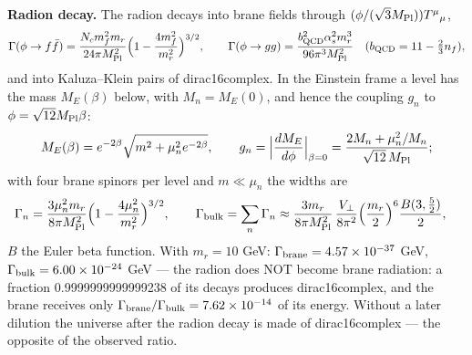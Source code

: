 \documentclass[10pt,a4paper]{article}
\begin{document}
\textbf{Radion decay.} The radion decays into brane fields through $(\phi/(\sqrt3M_{\rm Pl}))T^\mu{}_\mu$,
\begin{equation*}
\Gamma(\phi\to f\bar f)=\frac{N_cm_f^2m_r}{24\pi M_{\rm Pl}^2}\Big(1-\frac{4m_f^2}{m_r^2}\Big)^{3/2},\qquad \Gamma(\phi\to gg)=\frac{b_{\rm QCD}^2\alpha_s^2m_r^3}{96\pi^3M_{\rm Pl}^2}\quad(b_{\rm QCD}=11-\tfrac23n_f),
\end{equation*}
and into Kaluza–Klein pairs of dirac16complex. In the Einstein frame a level has the mass $M_E(\beta)$ below, with $M_n=M_E(0)$, and hence the coupling $g_n$ to $\phi=\sqrt{12}M_{\rm Pl}\beta$:
\begin{equation*}
M_E(\beta)=e^{-2\beta}\sqrt{m^2+\mu_n^2e^{-2\beta}},\qquad g_n=\Big|\frac{dM_E}{d\phi}\Big|_{\beta=0}=\frac{2M_n+\mu_n^2/M_n}{\sqrt{12}\,M_{\rm Pl}};
\end{equation*}
with four brane spinors per level and $m\ll\mu_n$ the widths are
\begin{align*}
\Gamma_n&=\frac{3\mu_n^2m_r}{8\pi M_{\rm Pl}^2}\Big(1-\frac{4\mu_n^2}{m_r^2}\Big)^{3/2},\qquad \Gamma_{\rm bulk}=\sum_n\Gamma_n\approx\frac{3m_r}{8\pi M_{\rm Pl}^2}\,\frac{V_\perp}{8\pi^2}\Big(\frac{m_r}2\Big)^6\frac{B(3,\frac52)}2,
\end{align*}
$B$ the Euler beta function. With $m_r=10$ GeV: $\Gamma_{\rm brane}=4.57\times10^{-37}$ GeV, $\Gamma_{\rm bulk}=6.00\times10^{-24}$ GeV — the radion does NOT become brane radiation: a fraction 0.9999999999999238 of its decays produces dirac16complex, and the brane receives only $\Gamma_{\rm brane}/\Gamma_{\rm bulk}=7.62\times10^{-14}$ of its energy. Without a later dilution the universe after the radion decay is made of dirac16complex — the opposite of the observed ratio.
\end{document}
